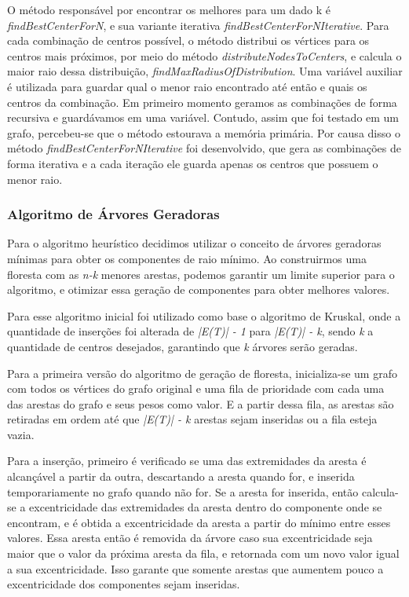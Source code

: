 O método responsável por encontrar os melhores para um dado k é \textit{findBestCenterForN}, e sua variante iterativa \textit{findBestCenterForNIterative}. Para cada combinação de centros possível, o método distribui os vértices para os centros mais próximos, por meio do método \textit{distributeNodesToCenters}, e calcula o maior raio dessa distribuição, \textit{findMaxRadiusOfDistribution}. Uma variável auxiliar é utilizada para guardar qual o menor raio encontrado até então e quais os centros da combinação. Em primeiro momento geramos as combinações de forma recursiva e guardávamos em uma variável. Contudo, assim que foi testado em um grafo, percebeu-se que o método estourava a memória primária. Por causa disso o método \textit{findBestCenterForNIterative} foi desenvolvido, que gera as combinações de forma iterativa e a cada iteração ele guarda apenas os centros que possuem o menor raio.

 \subsubsection{\esp Algoritmo de Árvores Geradoras}

Para o algoritmo heurístico decidimos utilizar o conceito de árvores
geradoras mínimas para obter os componentes de raio mínimo. Ao construirmos uma floresta com as \textit{n-k} menores arestas, podemos garantir um limite superior para o algoritmo, e otimizar essa geração de componentes para obter melhores valores.

Para esse algoritmo inicial foi utilizado como base o algoritmo de Kruskal, onde a quantidade de inserções foi alterada de \textit{|E(T)| - 1} para \textit{|E(T)| - k}, sendo \textit{k} a quantidade de centros desejados, garantindo que \textit{k} árvores serão geradas.


Para a primeira versão do algoritmo de geração de floresta, inicializa-se um grafo com todos os vértices do grafo original e uma fila de prioridade com cada uma das arestas do grafo e seus pesos como valor. E a partir dessa fila, as arestas são retiradas em ordem até que \textit{|E(T)| - k} arestas sejam inseridas ou a fila esteja vazia.

Para a inserção, primeiro é verificado se uma das extremidades da aresta é alcançável a partir da outra, descartando a aresta quando for, e inserida temporariamente no grafo quando não for. Se a aresta for inserida, então calcula-se a excentricidade das extremidades da aresta dentro do componente onde se encontram, e é obtida a excentricidade da aresta a partir do mínimo entre esses valores. Essa aresta então é removida da árvore caso sua excentricidade seja maior que o valor da próxima aresta da fila, e retornada com um novo valor igual a sua excentricidade. Isso garante que somente arestas que aumentem pouco a excentricidade dos componentes sejam inseridas.

